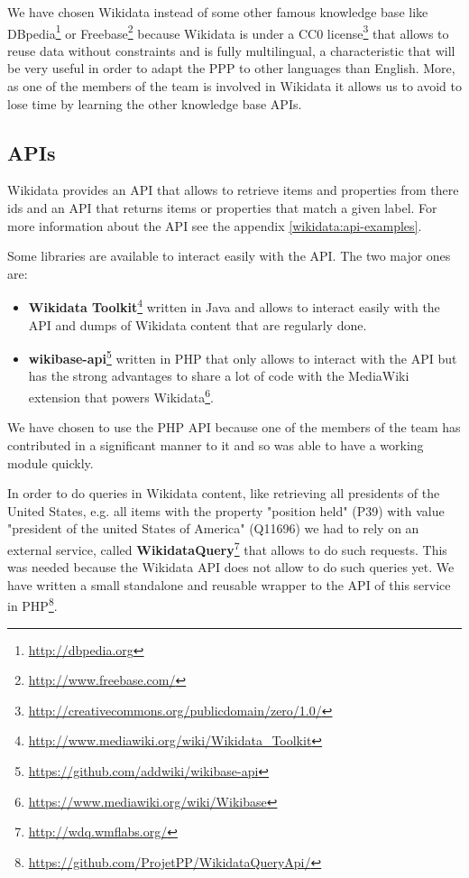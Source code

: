 We have chosen Wikidata instead of some other famous knowledge base like DBpedia\footnote{\url{http://dbpedia.org}} or Freebase\footnote{\url{http://www.freebase.com/}} because Wikidata is under a CC0 license\footnote{\url{http://creativecommons.org/publicdomain/zero/1.0/}} that allows to reuse data without constraints and is fully multilingual, a characteristic that will be very useful in order to adapt the PPP to other languages than English. More, as one of the members of the team is involved in Wikidata it allows us to avoid to lose time by learning the other knowledge base APIs.

\subsection{APIs}
Wikidata provides an API that allows to retrieve items and properties from there ids and an API that returns items or properties that match a given label. For more information about the API see the appendix \ref{wikidata:api-examples}.

Some libraries are available to interact easily with the API. The two major ones are:
\begin{itemize}
    \item \textbf{Wikidata Toolkit}\footnote{\url{http://www.mediawiki.org/wiki/Wikidata_Toolkit}} written in Java and allows to interact easily with the API and dumps of Wikidata content that are regularly done.
    \item \textbf{wikibase-api}\footnote{\url{https://github.com/addwiki/wikibase-api}} written in PHP that only allows to interact with the API but has the strong advantages to share a lot of code with the MediaWiki extension that powers Wikidata\footnote{\url{https://www.mediawiki.org/wiki/Wikibase}}.
\end{itemize}

We have chosen to use the PHP API because one of the members of the team has contributed in a significant manner to it and so was able to have a working module quickly.

In order to do queries in Wikidata content, like retrieving all presidents of the United States, e.g. all items with the property "position held" (P39) with value "president of the united States of America" (Q11696) we had to rely on an external service, called \textbf{WikidataQuery}\footnote{\url{http://wdq.wmflabs.org/}} that allows to do such requests. This was needed because the Wikidata API does not allow to do such queries yet. We have written a small standalone and reusable wrapper to the API of this service in PHP\footnote{\url{https://github.com/ProjetPP/WikidataQueryApi/}}.

